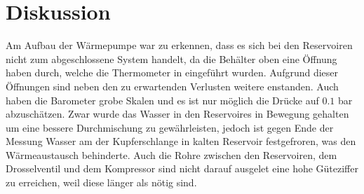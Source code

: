 \section{Diskussion}
\label{sec:Diskussion}

Am Aufbau der Wärmepumpe war zu erkennen, dass es sich bei den Reservoiren nicht zum abgeschlossene System handelt, da die Behälter oben eine Öffnung haben durch, welche die Thermometer in eingeführt wurden.
Aufgrund dieser Öffnungen sind neben den zu erwartenden Verlusten weitere enstanden. Auch haben die Barometer grobe Skalen und es ist nur möglich die Drücke auf {$0.1$} bar abzuschätzen.
Zwar wurde das Wasser in den Reservoires in Bewegung gehalten um eine bessere Durchmischung zu gewährleisten, jedoch ist gegen Ende der Messung Wasser am der Kupferschlange in kalten Reservoir festgefroren, was den Wärmeaustausch behinderte.
Auch die Rohre zwischen den Reservoiren, dem Drosselventil und dem Kompressor sind nicht darauf ausgelet eine hohe Güteziffer zu erreichen, weil diese länger als nötig sind.